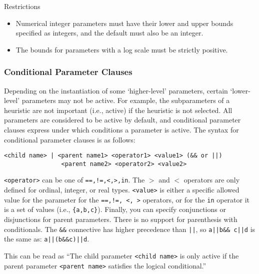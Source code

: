 \documentclass[manual.tex]{subfiles}
\begin{document}
\begin{bclogo}[logo=\bcattention, couleurBarre=red, noborder=true]{Restrictions}
\begin{itemize} 
	\item Numerical integer parameters must have their lower and upper bounds specified as integers, and the default must also be an integer.
	\item The bounds for parameters with a log scale must be strictly positive.
\end{itemize}
\end{bclogo}

\subsubsection{Conditional Parameter Clauses}

Depending on the instantiation of some `higher-level' parameters, certain `lower-level' parameters may not be active.
For example, the subparameters of a heuristic are not important (i.e., active) if the heuristic is not selected.
%
All parameters are considered to be active by default, and conditional parameter clauses express 
under which conditions a parameter is active. The syntax for conditional parameter clauses is as follows:

\begin{verbatim}
<child name> | <parent name1> <operator1> <value1> (&& or ||) 
				<parent name2> <operator2> <value2>
\end{verbatim}

\texttt{<operator>} can be one of \texttt{==,!=,<,>,in}. The $>$ and $<$ operators are only defined for ordinal, integer, or real types. \texttt{<value>} is either a specific allowed value for the parameter for the \texttt{==,!=, <, >} operators, or for the \texttt{in} operator it is a set of values (i.e., \texttt{\{a,b,c\}}). Finally, you can specify conjunctions or disjunctions for parent parameters. There is no support for parenthesis with conditionals. The \texttt{\&\&} connective has higher precedence than \texttt{||}, so  \texttt{a||b\&\& c||d} is the same as: \texttt{a||(b\&\&\!c)||d}.

%
This can be read as ``The child parameter \texttt{<child name>} is only active if the parent parameter \texttt{<parent name>} satisfies the logical conditional.''
\end{document}
